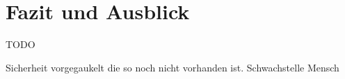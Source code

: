 \chapter{Fazit und Ausblick}\label{ch:FazitundAusblick}

TODO

Sicherheit vorgegaukelt die so noch nicht vorhanden ist. Schwachstelle Mensch 



